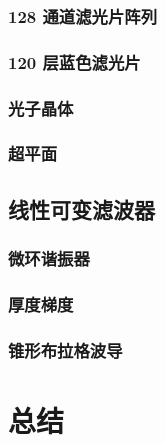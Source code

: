 \documentclass[9 pt,makeindex]{beamer}
\begin{document}
\subsubsection{128 通道滤光片阵列}

\subsubsection{120 层蓝色滤光片}

\subsubsection{光子晶体}

\subsubsection{超平面}


\subsection{线性可变滤波器}
\subsubsection{微环谐振器}

\subsubsection{厚度梯度}

\subsubsection{锥形布拉格波导}



\section{总结}

\end{document}
